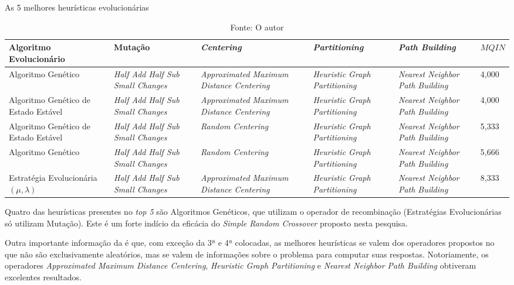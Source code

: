 \begin{table}
	\centering
	\caption{As 5 melhores heurísticas evolucionárias}
	\label{top5}
	\begin{tabularx}{\linewidth}{|X|X|X|X|X|X|}
		\hline
		\textbf{Algoritmo Evolucionário} & \textbf{Mutação} & \textbf{\textit{Centering}} & \textbf{\textit{Partitioning}} & \textbf{\textit{Path Building}} & \textbf{$MQIN$} \\
		\hline
		Algoritmo Genético & \textit{Half Add Half Sub Small Changes} & \textit{Approximated Maximum Distance Centering} & \textit{Heuristic Graph Partitioning} & \textit{Nearest Neighbor Path Building} &  4,000\\
		\hline
		Algoritmo Genético de Estado Estável & \textit{Half Add Half Sub Small Changes} & \textit{Approximated Maximum Distance Centering} & \textit{Heuristic Graph Partitioning} & \textit{Nearest Neighbor Path Building} & 4,000\\
		\hline
		Algoritmo Genético de Estado Estável & \textit{Half Add Half Sub Small Changes} & \textit{Random Centering} & \textit{Heuristic Graph Partitioning} & \textit{Nearest Neighbor Path Building} & 5,333\\
		\hline
		Algoritmo Genético & \textit{Half Add Half Sub Small Changes} & \textit{Random Centering} & \textit{Heuristic Graph Partitioning} & \textit{Nearest Neighbor Path Building} & 5,666\\
		\hline
		Estratégia Evolucionária $(\mu, \lambda)$ & \textit{Half Add Half Sub Small Changes} & \textit{Approximated Maximum Distance Centering} & \textit{Heuristic Graph Partitioning} & \textit{Nearest Neighbor Path Building} & 8,333\\
		\hline
	\end{tabularx}
	\caption*{Fonte: O autor}
\end{table}

Quatro das heurísticas presentes no \textit{top 5} são Algoritmos Genéticos, que 
utilizam o operador de recombinação (Estratégias Evolucionárias só utilizam 
Mutação). Este é um forte indício da eficácia do 
\textit{Simple Random Crossover} proposto nesta pesquisa.

Outra importante informação da  é que, com exceção da 3ª e 4ª 
colocadas, as melhores heurísticas se valem dos operadores propostos no 
 que não são exclusivamente aleatórios, mas se valem de 
informações sobre o problema para computar suas respostas. Notoriamente, os 
operadores \textit{Approximated Maximum Distance Centering}, 
\textit{Heuristic Graph Partitioning} e \textit{Nearest Neighbor Path Building} 
obtiveram excelentes resultados.

